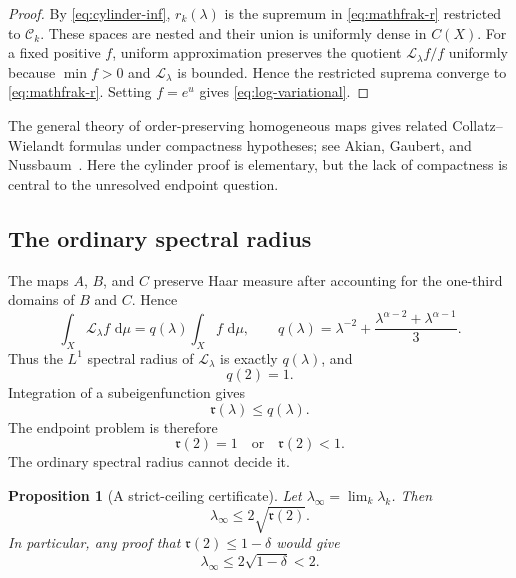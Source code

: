 \documentclass[11pt]{amsart}
\numberwithin{equation}{section}
\newtheorem{proposition}[theorem]{Proposition}
\newcommand{\dd}{\,\mathrm d}
\begin{document}
\begin{proof}
By \eqref{eq:cylinder-inf}, $r_k(\lambda)$ is the supremum in \eqref{eq:mathfrak-r} restricted to $\mathcal C_k$.  These spaces are nested and their union is uniformly dense in $C(X)$.  For a fixed positive $f$, uniform approximation preserves the quotient $\mathcal L_\lambda f/f$ uniformly because $\min f>0$ and $\mathcal L_\lambda$ is bounded.  Hence the restricted suprema converge to \eqref{eq:mathfrak-r}.  Setting $f=e^u$ gives \eqref{eq:log-variational}.
\end{proof}

The general theory of order-preserving homogeneous maps gives related Collatz--Wielandt formulas under compactness hypotheses; see Akian, Gaubert, and Nussbaum~\cite{AkianGaubertNussbaum}.  Here the cylinder proof is elementary, but the lack of compactness is central to the unresolved endpoint question.

\subsection{The ordinary spectral radius}

The maps $A$, $B$, and $C$ preserve Haar measure after accounting for the one-third domains of $B$ and $C$.  Hence
\begin{equation}\label{eq:q-lambda}
\int_X\mathcal L_\lambda f\,\dd\mu
=q(\lambda)\int_Xf\,\dd\mu,
\qquad
q(\lambda)
=\lambda^{-2}
+\frac{\lambda^{\alpha-2}+\lambda^{\alpha-1}}3.
\end{equation}
Thus the $L^1$ spectral radius of $\mathcal L_\lambda$ is exactly $q(\lambda)$, and
\begin{equation}\label{eq:q2}
q(2)=1.
\end{equation}
Integration of a subeigenfunction gives
\begin{equation}\label{eq:r-below-q}
\mathfrak r(\lambda)\le q(\lambda).
\end{equation}
The endpoint problem is therefore
\begin{equation}\label{eq:endpoint-problem}
\mathfrak r(2)=1
\quad\text{or}\quad
\mathfrak r(2)<1.
\end{equation}
The ordinary spectral radius cannot decide it.

\begin{proposition}[A strict-ceiling certificate]\label{prop:strict-ceiling}
Let $\lambda_\infty=\lim_k\lambda_k$.  Then
\begin{equation}\label{eq:lambda-infty-bound}
\lambda_\infty\le2\sqrt{\mathfrak r(2)}.
\end{equation}
In particular, any proof that $\mathfrak r(2)\le1-\delta$ would give
\[
\lambda_\infty\le2\sqrt{1-\delta}<2.
\]
\end{proposition}
\end{document}
